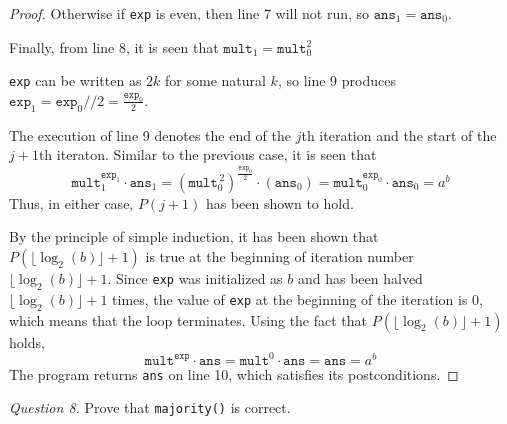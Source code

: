 \documentclass[11pt]{article}
\begin{document}
\begin{enumerate}[label=(\alph*)]
\begin{proof}
            Otherwise if \verb|exp| is even, then line 7 will not run, so \(\texttt{ans}_1 = \texttt{ans}_0\).

            Finally, from line 8, it is seen that \(\texttt{mult}_1 = \texttt{mult}_0^2\)

            \verb|exp| can be written as \(2k\) for some natural \(k\), so line 9 produces \(\texttt{exp}_1 = \texttt{exp}_0 // 2 = \frac{\texttt{exp}_0}{2}\).

            The execution of line 9 denotes the end of the \(j\)th iteration and the start of the \(j+1\)th iteraton. Similar to the previous case, it is seen that 
            \[
                \texttt{mult}_1^{\texttt{exp}_1} \cdot \texttt{ans}_1 = (\texttt{mult}_0^{\, 2})^\frac{\texttt{exp}_0}{2} \cdot (\texttt{ans}_0) = \texttt{mult}_0^{\texttt{exp}_0} \cdot \texttt{ans}_0 = a^b
            \]
            Thus, in either case, \(P(j+1)\) has been shown to hold.

            By the principle of simple induction, it has been shown that \(P(\lfloor \log _2(b) \rfloor + 1)\) is true at the beginning of iteration number \(\lfloor \log _2(b) \rfloor + 1\). Since \verb|exp| was initialized as \(b\) and has been halved \(\lfloor \log _2(b) \rfloor + 1\) times, the value of \verb|exp| at the beginning of the iteration is 0, which means that the loop terminates. Using the fact that \(P(\lfloor \log _2(b) \rfloor + 1)\) holds,
            \[
                \texttt{mult}^\texttt{exp} \cdot \texttt{ans} = \texttt{mult}^0 \cdot \texttt{ans} = \texttt{ans} = a^b
            \]
            The program returns \verb|ans| on line 10, which satisfies its postconditions.
        \end{proof}
    \end{enumerate}
    \textit{Question 8.} Prove that \verb|majority()| is correct.
\end{document}
